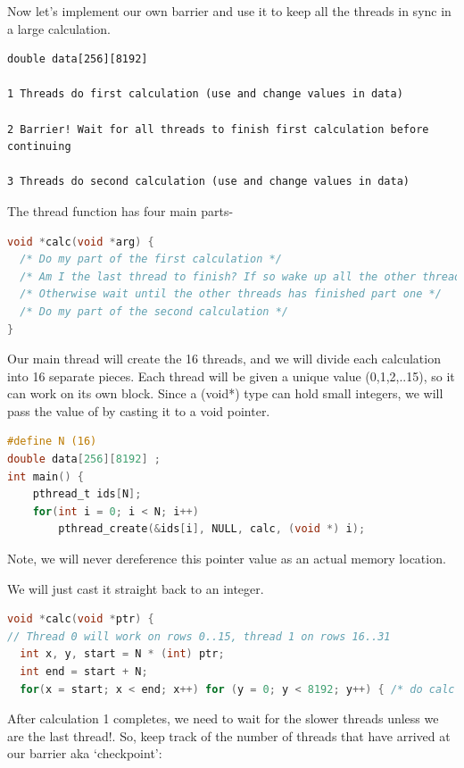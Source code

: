 Now let's implement our own barrier and use it to keep all the threads in sync in a large calculation.

\begin{verbatim}
double data[256][8192]

1 Threads do first calculation (use and change values in data)

2 Barrier! Wait for all threads to finish first calculation before continuing

3 Threads do second calculation (use and change values in data)
\end{verbatim}

The thread function has four main parts-

\begin{lstlisting}[language=C]
void *calc(void *arg) {
  /* Do my part of the first calculation */
  /* Am I the last thread to finish? If so wake up all the other threads! */
  /* Otherwise wait until the other threads has finished part one */
  /* Do my part of the second calculation */
}
\end{lstlisting}

Our main thread will create the 16 threads, and we will divide each calculation into 16 separate pieces.
Each thread will be given a unique value (0,1,2,..15), so it can work on its own block.
Since a (void*) type can hold small integers, we will pass the value of  by casting it to a void pointer.

\begin{lstlisting}[language=C]
#define N (16)
double data[256][8192] ;
int main() {
    pthread_t ids[N];
    for(int i = 0; i < N; i++)
        pthread_create(&ids[i], NULL, calc, (void *) i);
\end{lstlisting}

Note, we will never dereference this pointer value as an actual memory location.

We will just cast it straight back to an integer.

\begin{lstlisting}[language=C]
void *calc(void *ptr) {
// Thread 0 will work on rows 0..15, thread 1 on rows 16..31
  int x, y, start = N * (int) ptr;
  int end = start + N;
  for(x = start; x < end; x++) for (y = 0; y < 8192; y++) { /* do calc #1 */ }
\end{lstlisting}

After calculation 1 completes, we need to wait for the slower threads unless we are the last thread!.
So, keep track of the number of threads that have arrived at our barrier aka `checkpoint':

